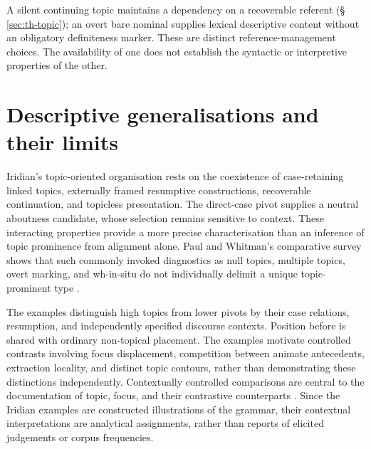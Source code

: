 A silent continuing topic maintains a dependency on a recoverable referent
 (§\,\ref{sec:th-topic}); an overt bare nominal supplies lexical descriptive
 content without an obligatory definiteness marker. These are distinct
 reference-management choices. The availability of one does not establish
 the syntactic or interpretive properties of the other.

\FloatBarrier
\section{Descriptive generalisations and their limits}\label{sec:tc-summary}

Iridian's topic-oriented organisation rests on the coexistence of case-retaining
 linked topics, externally framed resumptive constructions, recoverable
 continuation, and topicless presentation. The direct-case pivot supplies a
 neutral aboutness candidate, whose selection remains sensitive to context.
 These interacting properties provide a more precise characterisation than
 an inference of topic prominence from alignment alone. Paul and Whitman's
 comparative survey shows that such commonly invoked diagnostics as null
 topics, multiple topics, overt marking, and wh-in-situ do not individually
 delimit a unique topic-prominent type \cite{paulwhitman2017}.

The examples distinguish high topics from lower pivots by their case
 relations, resumption, and independently specified discourse contexts.
 Position before  is shared with ordinary non-topical placement. The examples motivate controlled contrasts involving focus displacement,
 competition between animate antecedents, extraction locality, and distinct
 topic contours, rather than demonstrating these distinctions independently. Contextually controlled comparisons are central to the
 documentation of topic, focus, and their contrastive counterparts
 \cite{aissen2026}. Since the Iridian examples are constructed illustrations
 of the grammar, their contextual interpretations are analytical assignments,
 rather than reports of elicited judgements or corpus frequencies.
